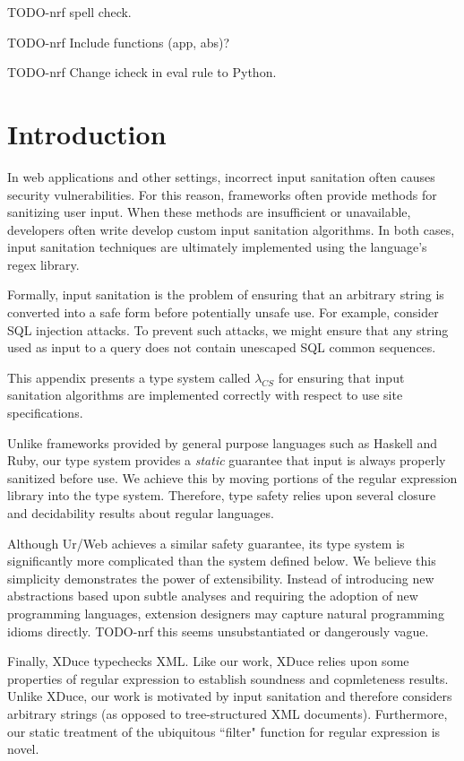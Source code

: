 \documentclass[10pt,preprint]{sigplanconf}
\theoremstyle{definition}
\newcommand{\lcs}{\lambda_{CS}}
\begin{document}
TODO-nrf spell check.

TODO-nrf Include functions (app, abs)?

TODO-nrf Change icheck in eval rule to Python.

\section{Introduction}
In web applications and other settings, incorrect input sanitation often causes
security vulnerabilities. For this reason, frameworks often provide methods
for sanitizing user input. When these methods are insufficient or unavailable,
developers often write develop custom input sanitation algorithms. In both cases,
input sanitation techniques are ultimately implemented using the language's
regex library.

Formally, input sanitation is the problem of ensuring that an arbitrary string
is converted into a safe form before potentially unsafe use. For example, consider
SQL injection attacks. To prevent such attacks, we might ensure that any string
used as input to a query does not contain unescaped SQL common sequences. 

This appendix presents a type system called $\lcs$ for ensuring that input 
sanitation algorithms are implemented correctly with respect to use site 
specifications.

Unlike frameworks provided by general purpose languages such as Haskell and
Ruby, our type system provides a \emph{static} guarantee that input is always 
properly sanitized before use. We achieve this by moving portions of the regular
expression library into the type system. Therefore, type safety relies upon 
several closure and decidability results about regular languages.

Although Ur/Web achieves a similar safety guarantee, its type system is significantly
more complicated than the system defined below. We believe this simplicity 
demonstrates the power of extensibility. Instead of introducing new abstractions
based upon subtle analyses and requiring the adoption of new programming languages, 
extension designers may capture natural programming idioms directly. TODO-nrf this seems unsubstantiated or dangerously vague.

Finally, XDuce typechecks XML. Like our work, XDuce relies upon some properties of
regular expression to establish soundness and copmleteness results. Unlike
XDuce, our work is motivated by input sanitation and therefore considers arbitrary
strings (as opposed to tree-structured XML documents). Furthermore, our static
treatment of the ubiquitous ``filter" function for regular expression is novel.
\end{document}
